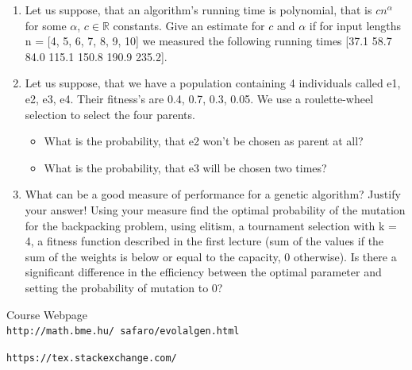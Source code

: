 \documentclass[12pt,english]{article}
\begin{document}
\begin{enumerate}
	\item Let us suppose, that an algorithm’s running time is polynomial, that is $cn^\alpha$ for some $\alpha$, $c \in \mathbb{R}$ constants. Give an estimate for
$c$ and $\alpha$ if for input lengths n = [4, 5, 6, 7, 8, 9, 10] we measured the following running times [37.1 58.7 84.0 115.1 150.8 190.9 235.2].
	\item Let us suppose, that we have a population containing 4 individuals called e1, e2, e3, e4. Their fitness’s are 0.4, 0.7, 0.3, 0.05. We use a roulette-wheel selection to select the four parents.
	\begin{itemize}
		\item What is the probability, that e2 won’t be chosen as parent at all?
		\item What is the probability, that e3 will be chosen two times?
	\end{itemize}
	\item What can be a good measure of performance for a genetic algorithm? Justify your answer! Using your measure find the optimal probability of the mutation for the backpacking problem, using elitism, a tournament selection with k = 4, a fitness function described in the first lecture (sum of the values if the sum of the weights is below or equal to the capacity, 0 otherwise). Is there a significant difference in the efficiency between the optimal parameter and setting the probability of mutation to 0?

\end{enumerate}


\begin{thebibliography}{9}

Course Webpage
\\\texttt{http://math.bme.hu/~safaro/evolalgen.html}


\texttt{https://tex.stackexchange.com/}

\end{thebibliography}
\end{document}
